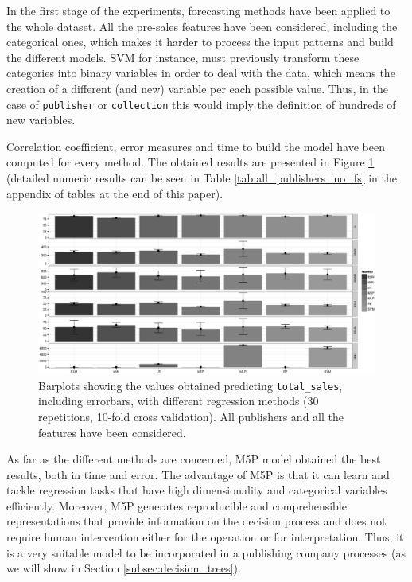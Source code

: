 \documentclass[a4paper,10pt,twocolumn,preprint,3p]{elsarticle}
\begin{document}
In the first stage of the experiments, forecasting methods have been
applied to the whole dataset. All the pre-sales features have been
considered, including the categorical ones, which makes it harder to
process the input patterns and build the different models. SVM for
instance, must previously transform these categories into binary
variables in order to deal with the data, which means the creation of
a different (and new) variable per each possible value. Thus, in the
case of \texttt{publisher} or \texttt{collection} this would imply the definition of hundreds of new variables. 

Correlation coefficient, error measures and time to build the model have been 
computed for every method. The obtained results are presented in 
Figure \ref{fig:all_publishers_no_fs}
(detailed numeric results can be seen in Table \ref{tab:all_publishers_no_fs}
in the appendix of tables at the end of this paper).

\begin{figure}[ht]
\begin{center}
\includegraphics[scale=0.38]{./imgs/prediction_all_publisher_all_features_Table3.eps}
\end{center}
\caption{Barplots showing the values obtained predicting \texttt{total\_sales}, including errorbars, with different regression methods (30 repetitions, 10-fold cross validation). All publishers and all the features have been considered.}
\label{fig:all_publishers_no_fs}
\end{figure}


As far as the different methods are concerned, M5P model obtained the best results, 
both in time and error. The advantage of M5P is that it can learn and tackle 
regression tasks that have high dimensionality and categorical variables efficiently. 
Moreover, M5P generates reproducible and comprehensible representations that 
provide information on the decision process and does not require human intervention 
either for the operation or for interpretation. Thus, it is a very suitable model to be incorporated in a publishing company processes (as we will show in 
Section \ref{subsec:decision_trees}).
\end{document}
